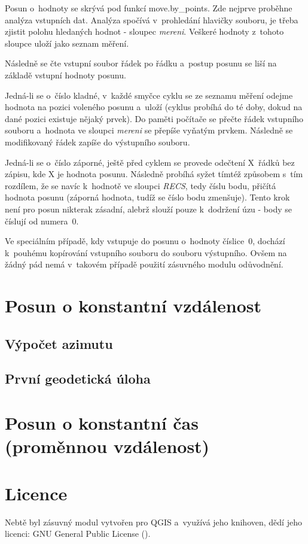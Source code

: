 Posun o~hodnoty se skrývá pod funkcí move.by\_points. Zde nejprve proběhne analýza vstupních dat.
Analýza spočívá v~prohledání hlavičky souboru, je třeba zjistit polohu hledaných hodnot - sloupec
\textit{mereni}. Veškeré hodnoty z~tohoto sloupce uloží jako seznam měření. 

Následně se čte vstupní soubor řádek po řádku a~postup posunu se liší na základě vstupní hodnoty posunu. 

Jedná-li se o~číslo kladné, v~každé smyčce cyklu se ze seznamu měření odejme hodnota na pozici
voleného posunu a~uloží (cyklus probíhá do té doby, dokud na dané pozici existuje nějaký prvek). Do paměti
počítače se přečte řádek vstupního souboru a~hodnota ve sloupci \textit{mereni} se přepíše vyňatým prvkem. 
Následně se modifikovaný řádek zapíše do výstupního souboru. 

Jedná-li se o~číslo záporné, ještě před cyklem se provede odečtení X~řádků bez zápisu, kde X je hodnota
posunu. Následně probíhá syžet tímtéž způsobem s~tím rozdílem, že se navíc k~hodnotě ve sloupci
\textit{RECS}, tedy číslu bodu, přičítá hodnota posunu (záporná hodnota, tudíž se číslo bodu
zmenšuje). Tento krok není pro posun nikterak zásadní, alebrž slouží pouze k~dodržení úzu - body
se číslují od numera~0. 

Ve speciálním případě, kdy vstupuje do posunu o~hodnoty číslice~0, dochází k~pouhému kopírování vstupního
souboru do souboru výstupního. Ovšem na žádný pád nemá v~takovém případě použití zásuvného modulu
odůvodnění. 

\section{Posun o konstantní vzdálenost}
\label{by_distance}

\subsection{Výpočet azimutu}
\label{azimut}

\subsection{První geodetická úloha}
\label{prvniguplugin}

\section{Posun o konstantní čas (proměnnou vzdálenost)}
\label{by_seconds}

\section{Licence}
\label{licence}

Nebtě byl zásuvný modul vytvořen pro QGIS a~využívá jeho knihoven, dědí jeho licenci: GNU General Public
License (). 



